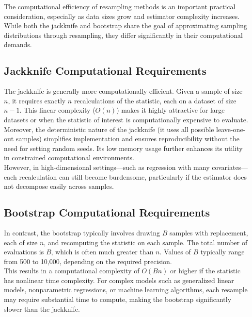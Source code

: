 \documentclass{article}
\begin{document}
The computational efficiency of resampling methods is an important practical consideration, especially as data sizes grow and estimator complexity increases. While both the jackknife and bootstrap share the goal of approximating sampling distributions through resampling, they differ significantly in their computational demands.\\

\subsection{Jackknife Computational Requirements}

The jackknife is generally more computationally efficient. Given a sample of size $n$, it requires exactly $n$ recalculations of the statistic, each on a dataset of size $n - 1$. This linear complexity ($O(n)$) makes it highly attractive for large datasets or when the statistic of interest is computationally expensive to evaluate.\\

Moreover, the deterministic nature of the jackknife (it uses all possible leave-one-out samples) simplifies implementation and ensures reproducibility without the need for setting random seeds. Its low memory usage further enhances its utility in constrained computational environments.\\

However, in high-dimensional settings—such as regression with many covariates—each recalculation can still become burdensome, particularly if the estimator does not decompose easily across samples.\\

\subsection{Bootstrap Computational Requirements}

In contrast, the bootstrap typically involves drawing $B$ samples with replacement, each of size $n$, and recomputing the statistic on each sample. The total number of evaluations is $B$, which is often much greater than $n$. Values of $B$ typically range from 500 to 10,000, depending on the required precision.\\

This results in a computational complexity of $O(Bn)$ or higher if the statistic has nonlinear time complexity. For complex models such as generalized linear models, nonparametric regressions, or machine learning algorithms, each resample may require substantial time to compute, making the bootstrap significantly slower than the jackknife.\\
\end{document}
